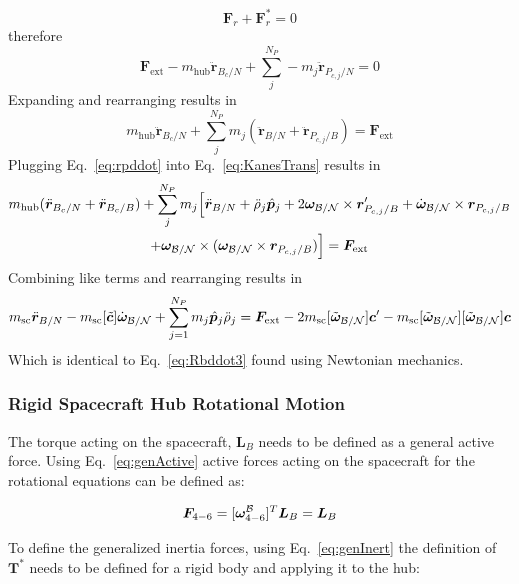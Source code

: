\begin{equation}
	\bm F_r + \bm F^*_r = 0
	\label{eq:KanesEq}
\end{equation}
therefore
\begin{equation}
	\bm F_{\text{ext}} -m_{\text{hub}} \ddot{\bm r}_{B_c/N} + \sum\limits_{j}^{N_P} -m_j \ddot{\bm r}_{P_{c,j}/N} = 0
\end{equation}
Expanding and rearranging results in
\begin{equation}
	m_{\text{hub}} \ddot{\bm r}_{B_c/N} + \sum\limits_{j}^{N_P} m_j (\ddot{\bm r}_{B/N} + \ddot{\bm r}_{P_{c,j}/B}) = \bm F_{\text{ext}}
	\label{eq:KanesTrans}
\end{equation}
Plugging Eq.~\eqref{eq:rpddot} into Eq.~\eqref{eq:KanesTrans} results in
\begin{multline}
	m_{\text{hub}} (\ddot{\bm r}_{B_c/N} + \ddot{\bm r}_{B_c/B}) + \sum\limits_{j}^{N_P} m_j \Big[\ddot{\bm r}_{B/N} + \ddot{\rho}_j \hat{\bm p}_j  +2 \bm\omega_{\cal B/N} \times \bm{r}'_{P_{c,j}/B} + \dot{\bm\omega}_{\cal B/N} \times \bm{r}_{P_{c,j}/B}  \\
	+\bm\omega_{\cal B/N} \times (\bm\omega_{\cal B/N} \times \bm{r}_{P_{c,j}/B})\Big] = \bm F_{\text{ext}}
\end{multline}
Combining like terms and rearranging results in
\begin{equation}
	m_{\text{sc}} \ddot{\bm r}_{B/N}-m_{\text{sc}} [\tilde{\bm{c}}] \dot{\bm\omega}_{\cal B/N} +\sum_{j=1}^{N_{P}}m_j \hat{\bm p}_j \ddot{\rho}_j = \bm F_{\text{ext}}	- 2 m_{\text{sc}} [\tilde{\bm\omega}_{\cal B/N}] \bm c'
	- m_{\text{sc}} [\tilde{\bm\omega}_{\cal B/N}][\tilde{\bm\omega}_{\cal B/N}]\bm{c}
	\label{eq:Rbddot4}
\end{equation}
Which is identical to Eq.~\eqref{eq:Rbddot3} found using Newtonian mechanics.
\subsubsection{Rigid Spacecraft Hub Rotational Motion}

The torque acting on the spacecraft, $\bm L_B$ needs to be defined as a general active force. Using Eq.~\eqref{eq:genActive} active forces acting on the spacecraft for the rotational equations can be defined as:

\begin{equation}
	\bm F_{4-6} = [\bm \omega_{4-6}^{\cal{B}}]^T \bm L_B = \bm L_B
\end{equation}

To define the generalized inertia forces, using Eq.~\eqref{eq:genInert} the definition of $\bm T^*$ needs to be defined for a rigid body and applying it to the hub:

